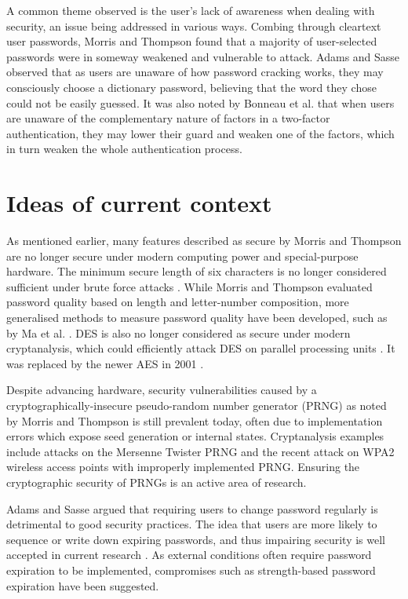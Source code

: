 \documentclass[11pt]{article}
\begin{document}
A common theme observed is the user's lack of awareness when dealing with security, an issue being addressed in various ways. Combing through cleartext user passwords, Morris and Thompson \cite[p. 596]{morris1979password} found that a majority of user-selected passwords were in someway weakened and vulnerable to attack. Adams and Sasse \cite[p. 3]{adams1999users} observed that as users are unaware of how password cracking works, they may consciously choose a dictionary password, believing that the word they chose could not be easily guessed. It was also noted by Bonneau et al. \cite[Sec. V]{bonneau2012quest} that when users are unaware of the complementary nature of factors in a two-factor authentication, they may lower their guard and weaken one of the factors, which in turn weaken the whole authentication process.

\section{Ideas of current context}

As mentioned earlier, many features described as secure by Morris and Thompson \cite{morris1979password} are no longer secure under modern computing power and special-purpose hardware. The minimum secure length of six characters is no longer considered sufficient under brute force attacks \cite{weir2010testing}. While Morris and Thompson evaluated password quality based on length and letter-number composition, more generalised methods to measure password quality have been developed, such as by Ma et al. \cite{ma2010password}. DES is also no longer considered as secure under modern cryptanalysis, which could efficiently attack DES on parallel processing units \cite{biham1993differential}. It was replaced by the newer AES in 2001 \cite{standard2001announcing}.

Despite advancing hardware, security vulnerabilities caused by a cryptographically-insecure pseudo-random number generator (PRNG) as noted by Morris and Thompson \cite[p. 596]{morris1979password} is still prevalent today, often due to implementation errors which expose seed generation or internal states. Cryptanalysis examples include attacks on the Mersenne Twister PRNG \cite{argyros2012forgot} and the recent attack on WPA2 wireless access points \cite{vanhoef2017key} with improperly implemented PRNG. Ensuring the cryptographic security of PRNGs is an active area of research.

Adams and Sasse \cite{adams1999users} argued that requiring users to change password regularly is detrimental to good security practices. The idea that users are more likely to sequence or write down expiring passwords, and thus impairing security is well accepted in current research \cite{zhang2010security, chiasson2015quantifying}. As external conditions often require password expiration to be implemented, compromises such as strength-based password expiration \cite{johansson2015strength} have been suggested.
\end{document}
